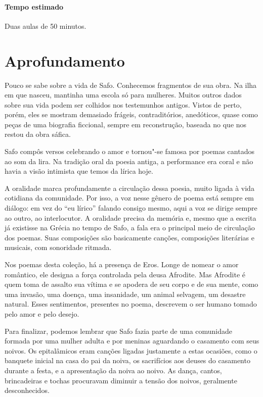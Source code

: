 \documentclass[12pt]{extarticle}
\begin{document}
\paragraph{Tempo estimado} Duas aulas de 50 minutos.


\section{Aprofundamento}

Pouco se sabe sobre a vida de Safo. Conhecemos fragmentos de sua obra.
Na ilha em que nasceu, mantinha uma escola só para mulheres. Muitos outros 
dados sobre sua vida podem ser colhidos nos testemunhos antigos. 
Vistos de perto, porém, eles se mostram demasiado frágeis,
contraditórios, anedóticos, quase como peças de uma biografia ficcional,
sempre em reconstrução, baseada no que nos restou da obra sáfica.

Safo compôs versos celebrando o amor e tornou"-se famosa por poemas
cantados ao som da lira. Na tradição oral da poesia antiga, a
performance era coral e não havia a visão intimista que temos da lírica
hoje.

A oralidade marca profundamente a circulação dessa poesia, muito ligada
à vida cotidiana da comunidade. Por isso, a voz nesse gênero de poema 
está sempre em diálogo: em vez do ``eu lírico'' falando consigo mesmo, 
aqui a voz se dirige sempre ao outro, ao interlocutor. A oralidade precisa 
da memória e, mesmo que a escrita já existisse na Grécia no tempo de Safo, 
a fala era o principal meio de circulação dos poemas. Suas composições são 
basicamente canções, composições literárias e musicais, com sonoridade ritmada. 

Nos poemas desta coleção, há a presença de Eros. Longe de nomear o amor
romântico, ele designa a força controlada pela deusa Afrodite. Mas Afrodite 
é quem toma de assalto sua vítima e se apodera de seu corpo e de sua
mente, como uma invasão, uma doença, uma insanidade, um animal
selvagem, um desastre natural. Esses sentimentos, presentes no poema, 
descrevem o ser humano tomado pelo amor e pelo desejo.

Para finalizar, podemos lembrar que Safo fazia parte de uma comunidade 
formada por uma mulher adulta e por meninas aguardando o casamento com
seus noivos. Os epitalâmicos eram canções ligadas justamente a estas ocasiões,
como o banquete inicial na casa do pai da noiva, os sacrifícios aos deuses do casamento 
durante a festa, e a apresentação da noiva ao noivo. As dança, cantos, brincadeiras
e tochas procuravam diminuir a tensão dos noivos, geralmente desconhecidos.
\end{document}
